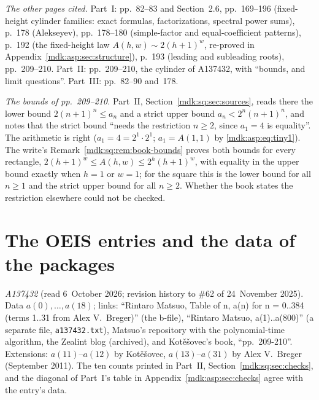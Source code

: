 \documentclass[11pt,letterpaper]{article}
\numberwithin{equation}{section}
\theoremstyle{remark}\newtheorem{remark}[theorem]{Remark}
\newcommand{\file}[1]{\nolinkurl{#1}}
\begin{document}
\emph{The other pages cited.} Part~I: pp.~82--83 and Section~2.6, pp.~169--196 (fixed-height cylinder families: exact formulas, factorizations, spectral power sums), p.~178 (Alekseyev), pp.~178--180 (simple-factor and equal-coefficient patterns), p.~192 (the fixed-height law $A(h,w)\sim2(h+1)^w$, re-proved in Appendix~\ref{mdk:asp:sec:structure}), p.~193 (leading and subleading roots), pp.~209--210. Part~II: pp.~209--210, the cylinder of A137432, with ``bounds, and limit questions''. Part~III: pp.~82--90 and~178.

\emph{The bounds of pp.~209--210.} Part~II, Section~\ref{mdk:sq:sec:sources}, reads there the lower bound $2(n+1)^n\le a_n$ and a strict upper bound $a_n<2^n(n+1)^n$, and notes that the strict bound ``needs the restriction $n\ge2$, since $a_1=4$ is equality''. The arithmetic is right ($a_1=4=2^1\cdot2^1$; $a_1=A(1,1)$ by \eqref{mdk:asp:eq:tiny1}). The write's Remark~\ref{mdk:sq:rem:book-bounds} proves both bounds for every rectangle, $2(h+1)^w\le A(h,w)\le2^h(h+1)^w$, with equality in the upper bound exactly when $h=1$ or $w=1$; for the square this is the lower bound for all $n\ge1$ and the strict upper bound for all $n\ge2$. Whether the book states the restriction elsewhere could not be checked.

\section*{The OEIS entries and the data of the packages}\label{mdk:sec:oeis}
\emph{A137432} (read 6~October 2026; revision history to \#62 of 24~November 2025). Data $a(0),\dots,a(18)$; links: ``Rintaro Matsuo, Table of n, a(n) for n = 0..384 (terms 1..31 from Alex V.~Breger)'' (the b-file), ``Rintaro Matsuo, a(1)..a(800)'' (a separate file, \file{a137432.txt}), Matsuo's repository with the polynomial-time algorithm, the Zealint blog (archived), and Kot\v e\v sovec's book, ``pp.~209-210''. Extensions: $a(11)$--$a(12)$ by Kot\v e\v sovec, $a(13)$--$a(31)$ by Alex V.~Breger (September 2011). The ten counts printed in Part~II, Section~\ref{mdk:sq:sec:checks}, and the diagonal of Part~I's table in Appendix~\ref{mdk:asp:sec:checks} agree with the entry's data.
\end{document}
